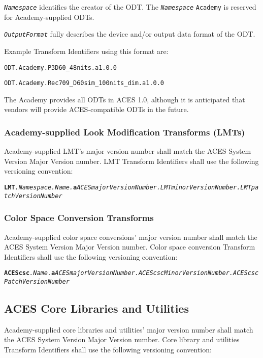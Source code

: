 \texttt{\textit{Namespace}} identifies the creator of the ODT. The \texttt{\textit{Namespace}} \texttt{Academy} is reserved for Academy-supplied ODTs.

\texttt{\textit{OutputFormat}} fully describes the device and/or output data format of the ODT.

Example Transform Identifiers using this format are:
\begin{listize}
	\item \texttt{ODT.Academy.P3D60\_48nits.a1.0.0}
	\item \texttt{ODT.Academy.Rec709\_D60sim\_100nits\_dim.a1.0.0}
\end{listize}

The Academy provides all ODTs in ACES 1.0, although it is anticipated that vendors will provide ACES-compatible ODTs in the future.

\subsubsection{Academy-supplied Look Modification Transforms (LMTs)}
Academy-supplied LMT's major version number shall match the ACES System Version Major Version number. LMT Transform Identifiers shall use the following versioning convention:

\begin{sloppypar}
\texttt{\textbf{LMT}\textit{.Namespace.Name.\-}\textbf{a}\textit{ACESmajorVersionNumber.\-LMTminorVersionNumber.LMT\-patchVersionNumber}}
\end{sloppypar}

\subsubsection{Color Space Conversion Transforms}
Academy-supplied color space conversions' major version number shall match the ACES System Version Major Version number. Color space conversion Transform Identifiers shall use the following versioning convention:

\begin{sloppypar}
\texttt{\textbf{ACEScsc}\textit{.Name.\-}\textbf{a}\textit{ACESmajorVersionNumber.\-ACEScscMinorVersionNumber.\-ACEScsc\-PatchVersionNumber}}
\end{sloppypar}

\subsection{ACES Core Libraries and Utilities}
Academy-supplied core libraries and utilities' major version number shall match the ACES System Version Major Version number. Core library and utilities Transform Identifiers shall use the following versioning convention:

